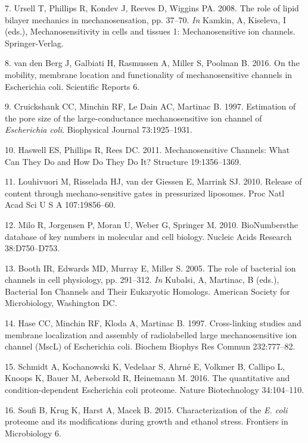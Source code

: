 \hypertarget{ref-ursell2008}{}
7.
Ursell
T,
Phillips
R,
Kondev
J,
Reeves
D,
Wiggins
PA.
2008.
The
role
of
lipid
bilayer
mechanics
in
mechanosensation,
pp.
37--70.
\emph{In}
Kamkin,
A,
Kiseleva,
I
(eds.),
Mechanosensitivity
in
cells
and
tissues
1:
Mechanosensitive
ion
channels.
Springer-Verlag.

\hypertarget{ref-vandenberg2016}{}
8. van
den
Berg
J,
Galbiati
H,
Rasmussen
A,
Miller
S,
Poolman
B.
2016.
On the
mobility,
membrane
location
and
functionality
of
mechanosensitive
channels
in
Escherichia
coli.
Scientific
Reports
6.

\hypertarget{ref-cruickshank1997}{}
9.
Cruickshank
CC,
Minchin
RF, Le
Dain
AC,
Martinac
B.
1997.
Estimation
of the
pore
size
of the
large-conductance
mechanosensitive
ion
channel
of
\emph{Escherichia
coli}.
Biophysical
Journal
73:1925--1931.

\hypertarget{ref-haswell2011}{}
10.
Haswell
ES,
Phillips
R,
Rees
DC.
2011.
Mechanosensitive
Channels:
What
Can
They
Do and
How Do
They
Do It?
Structure
19:1356--1369.

\hypertarget{ref-louhivuori2010}{}
11.
Louhivuori
M,
Risselada
HJ,
van
der
Giessen
E,
Marrink
SJ.
2010.
Release
of
content
through
mechano-sensitive
gates
in
pressurized
liposomes.
Proc
Natl
Acad
Sci U
S A
107:19856--60.

\hypertarget{ref-milo2010}{}
12.
Milo
R,
Jorgensen
P,
Moran
U,
Weber
G,
Springer
M.
2010.
BioNumbersthe
database
of key
numbers
in
molecular
and
cell
biology.
Nucleic
Acids
Research
38:D750--D753.

\hypertarget{ref-booth2005}{}
13.
Booth
IR,
Edwards
MD,
Murray
E,
Miller
S.
2005.
The
role
of
bacterial
ion
channels
in
cell
physiology,
pp.
291--312.
\emph{In}
Kubalsi,
A,
Martinac,
B
(eds.),
Bacterial
Ion
Channels
and
Their
Eukaryotic
Homologs.
American
Society
for
Microbiology,
Washington
DC.

\hypertarget{ref-hase1997}{}
14.
Hase
CC,
Minchin
RF,
Kloda
A,
Martinac
B.
1997.
Cross-linking
studies
and
membrane
localization
and
assembly
of
radiolabelled
large
mechanosensitive
ion
channel
(MscL)
of
Escherichia
coli.
Biochem
Biophys
Res
Commun
232:777--82.

\hypertarget{ref-schmidt2016}{}
15.
Schmidt
A,
Kochanowski
K,
Vedelaar
S,
Ahrné
E,
Volkmer
B,
Callipo
L,
Knoops
K,
Bauer
M,
Aebersold
R,
Heinemann
M.
2016.
The
quantitative
and
condition-dependent
Escherichia
coli
proteome.
Nature
Biotechnology
34:104--110.

\hypertarget{ref-soufi2015}{}
16.
Soufi
B,
Krug
K,
Harst
A,
Macek
B.
2015.
Characterization
of the
\emph{E.
coli}
proteome
and
its
modifications
during
growth
and
ethanol
stress.
Frontiers
in
Microbiology
6.

